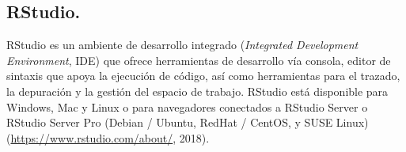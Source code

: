 \subsection{RStudio.}

RStudio es un ambiente de desarrollo integrado (\textit{Integrated Development Environment}, IDE) que ofrece herramientas de desarrollo vía consola, editor de sintaxis que apoya la ejecución de código, así como herramientas para el trazado, la depuración y la gestión del espacio de trabajo.  RStudio está disponible para Windows, Mac y Linux o para navegadores conectados a RStudio Server o RStudio Server Pro (Debian / Ubuntu, RedHat / CentOS, y SUSE Linux) (\url{https://www.rstudio.com/about/}, 2018).
 


